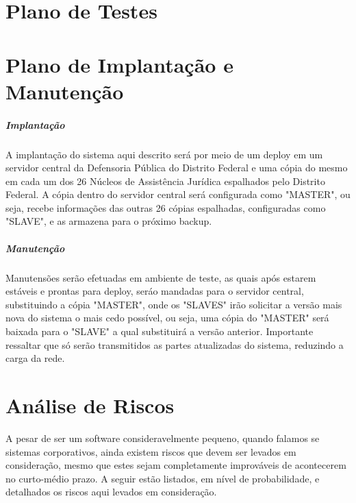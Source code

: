 \documentclass[12pt,a4paper]{report}
\begin{document}

\chapter{Plano de Testes}

\chapter{Plano de Implantação e Manutenção}
\paragraph{Implantação} A implantação do sistema aqui descrito será por meio de um deploy em um servidor central da Defensoria Pública do Distrito Federal e uma cópia do mesmo em cada um dos 26 Núcleos de Assistência Jurídica espalhados pelo Distrito Federal. A cópia dentro do servidor central será configurada como "MASTER", ou seja, recebe informações das outras 26 cópias espalhadas, configuradas como "SLAVE", e as armazena para o próximo backup.

\paragraph{Manutenção} Manutensões serão efetuadas em ambiente de teste, as quais após estarem estáveis e prontas para deploy, seráo mandadas para o servidor central, substituindo a cópia "MASTER", onde os "SLAVES" irão solicitar a versão mais nova do sistema o mais cedo possível, ou seja, uma cópia do "MASTER" será baixada para o "SLAVE" a qual substituirá a versão anterior. Importante ressaltar que só serão transmitidos as partes atualizadas do sistema, reduzindo a carga da rede.

\chapter{Análise de Riscos}

A pesar de ser um software consideravelmente pequeno, quando falamos se sistemas corporativos, ainda existem riscos que devem ser levados em consideração, mesmo que estes sejam completamente improváveis de acontecerem no curto-médio prazo. A seguir estão listados, em nível de probabilidade, e detalhados os riscos aqui levados em consideração.
\end{document}
